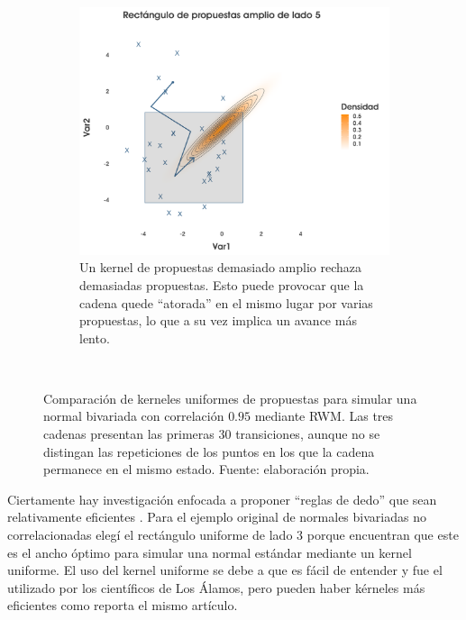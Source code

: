 \begin{figure}[h]
\begin{subfigure}{0.3\textwidth}
    \end{subfigure}
    ~
    \begin{subfigure}{0.3\textwidth}
        \includegraphics[width=\textwidth]{Figs/Bayes/Ejemplo_RWM_Compara3}
        \caption{Un kernel de propuestas demasiado amplio rechaza demasiadas propuestas. Esto puede provocar que la cadena quede ``atorada'' en el mismo lugar por varias propuestas, lo que a su vez implica un avance más lento.}
    \end{subfigure}
    ~
    \caption{Comparación de kerneles uniformes de propuestas para simular una normal bivariada con correlación $0.95$ mediante RWM. Las tres cadenas presentan las primeras $30$ transiciones, aunque no se distingan las repeticiones de los puntos en los que la cadena permanece en el mismo estado. Fuente: elaboración propia.}\label{fig:RWM_Corr}
\end{figure}

Ciertamente hay investigación enfocada a proponer ``reglas de dedo'' que sean relativamente eficientes \parencites{GelmanRobertsGilks96,Geyer05,YangRdz13}. Para el ejemplo original de normales bivariadas no correlacionadas elegí el rectángulo uniforme de lado $3$ porque \textcite{YangRdz13} encuentran que este es el ancho óptimo para simular una normal estándar mediante un kernel uniforme. El uso del kernel uniforme se debe a que es fácil de entender y fue el utilizado por los científicos de Los Álamos, pero pueden haber kérneles más eficientes como reporta el mismo artículo.\\ 

